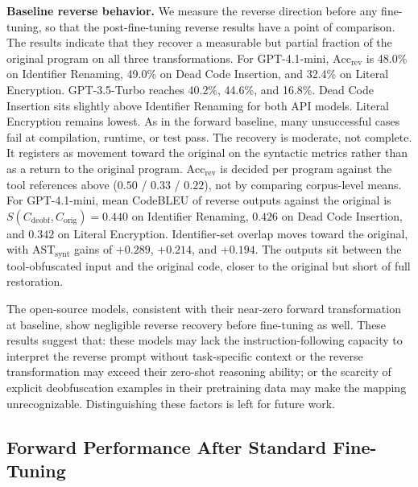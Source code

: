 \textbf{Baseline reverse behavior.} We measure the reverse direction before any fine-tuning, so that the
post-fine-tuning reverse results have a point of comparison. 
The results indicate that they recover a measurable but partial
fraction of the original program on all three transformations.
For GPT-4.1-mini, $\text{Acc}_{\text{rev}}$ is 48.0\% on Identifier Renaming,
49.0\% on Dead Code Insertion, and 32.4\% on Literal Encryption.
GPT-3.5-Turbo reaches 40.2\%, 44.6\%, and 16.8\%.
Dead Code Insertion sits slightly above Identifier Renaming for both API models.
Literal Encryption remains lowest. 
As in the forward baseline, many unsuccessful cases fail at compilation, runtime, or test pass.
The recovery is moderate, not complete. It
registers as movement toward the original on the syntactic metrics
rather than as a return to the original program.
$\mathrm{Acc}_{\text{rev}}$ is decided per program against the tool references
above ($0.50$ / $0.33$ / $0.22$), not by comparing corpus-level means.
For GPT-4.1-mini, mean CodeBLEU of reverse outputs against the original is
$S(C_{\text{deobf}}, C_{\text{orig}}) = 0.440$ on Identifier Renaming,
$0.426$ on Dead Code Insertion, and $0.342$ on Literal Encryption.
Identifier-set overlap moves toward the original, with
$\text{AST}_{\text{synt}}$ gains of $+0.289$, $+0.214$, and $+0.194$.
The outputs sit between the tool-obfuscated input and the original code,
closer to the original but short of full restoration. 

The open-source models, consistent with their near-zero forward transformation at baseline, show negligible reverse recovery before fine-tuning as well. These results suggest that: these models may lack the instruction-following capacity to interpret the reverse prompt without task-specific context or the reverse transformation may exceed their zero-shot reasoning ability; or the scarcity of explicit deobfuscation examples in their pretraining data may make the mapping unrecognizable. Distinguishing these factors is left for future work.








\subsection{Forward Performance After Standard Fine-Tuning}

